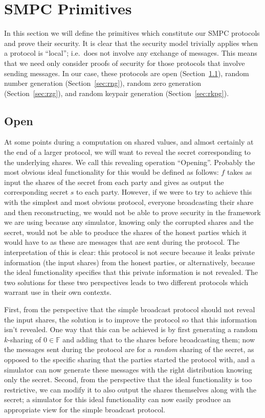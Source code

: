 \documentclass{article}
\theoremstyle{remark}
\newcommand{\F}{\mathbb{F}}
\begin{document}
\section{SMPC Primitives}

In this section we will define the primitives which constitute our SMPC
protocols and prove their security. It is clear that the security model
trivially applies when a protocol is ``local''; i.e.\ does not involve any
exchange of messages. This means that we need only consider proofs of security
for those protocols that involve sending messages. In our case, these protocols
are open (Section~\ref{sec:open}), random number generation
(Section~\ref{sec:rng}), random zero generation (Section~\ref{sec:rzg}), and
random keypair generation (Section~\ref{sec:rkpg}).

\subsection{Open}\label{sec:open}

At some points during a computation on shared values, and almost certainly at
the end of a larger protocol, we will want to reveal the secret corresponding
to the underlying shares. We call this revealing operation ``Opening''.
Probably the most obvious ideal functionality for this would be defined as
follows: $f$ takes as input the shares of the secret from each party and gives
as output the corresponding secret $s$ to each party. However, if we were to
try to achieve this with the simplest and most obvious protocol, everyone
broadcasting their share and then reconstructing, we would not be able to prove
security in the framework we are using because any simulator, knowing only the
corrupted shares and the secret, would not be able to produce the shares of the
honest parties which it would have to as these are messages that are sent
during the protocol. The interpretation of this is clear: this protocol is not
secure because it leaks private information (the input shares) from the honest
parties, or alternatively, because the ideal functionality specifies that this
private information is not revealed. The two solutions for these two
perspectives leads to two different protocols which warrant use in their own
contexts.

First, from the perspective that the simple broadcast protocol should not
reveal the input shares, the solution is to improve the protocol so that this
information isn't revealed. One way that this can be achieved is by first
generating a random $k$-sharing of $0 \in \F$ and adding that to the shares
before broadcasting them; now the messages sent during the protocol are for a
\textit{random} sharing of the secret, as opposed to the specific sharing that
the parties started the protocol with, and a simulator can now generate these
messages with the right distribution knowing only the secret. Second, from the
perspective that the ideal functionality is too restrictive, we can modify it
to also output the shares themselves along with the secret; a simulator for
this ideal functionality can now easily produce an appropriate view for the
simple broadcast protocol.
\end{document}
